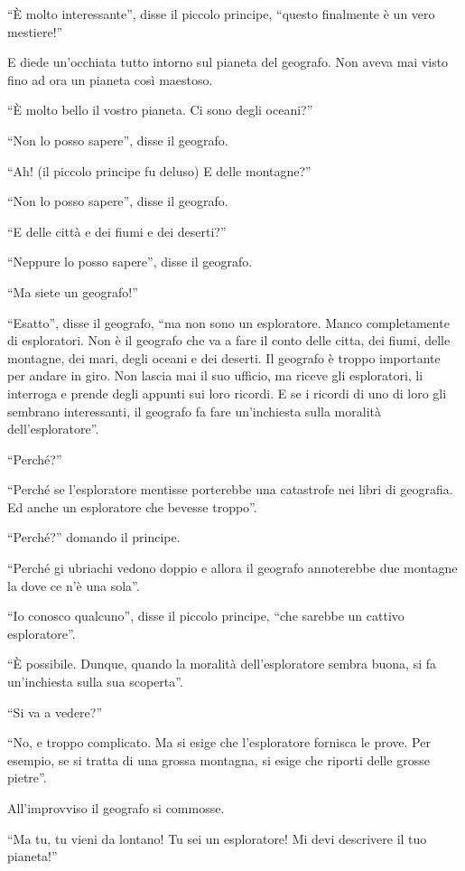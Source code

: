 \documentclass[11pt]{scrbook}
\begin{document}
``È molto interessante'', disse il piccolo principe, ``questo finalmente è un vero mestiere!''

E diede un'occhiata tutto intorno sul pianeta del geografo. Non aveva mai visto fino ad ora un pianeta così maestoso.

``È molto bello il vostro pianeta. Ci sono degli oceani?''

``Non lo posso sapere'', disse il geografo.

``Ah! (il piccolo principe fu deluso) E delle montagne?''

``Non lo posso sapere'', disse il geografo.

``E delle città e dei fiumi e dei deserti?''

``Neppure lo posso sapere'', disse il geografo.

``Ma siete un geografo!''

``Esatto'', disse il geografo, ``ma non sono un esploratore. Manco completamente di esploratori. Non è il geografo che va a fare il conto delle citta, dei fiumi, delle montagne, dei mari, degli oceani e dei deserti. Il geografo è troppo importante per andare in giro. Non lascia mai il suo ufficio, ma riceve gli esploratori, li interroga e prende degli appunti sui loro ricordi. E se i ricordi di uno di loro gli sembrano interessanti, il geografo fa fare un'inchiesta sulla moralità dell'esploratore''.

``Perché?''

``Perché se l'esploratore mentisse porterebbe una catastrofe nei libri di geografia. Ed anche un esploratore che bevesse troppo''.

``Perché?'' domando il principe.

``Perché gi ubriachi vedono doppio e allora il geografo annoterebbe due montagne la dove ce n'è una sola''.

``Io conosco qualcuno'', disse il piccolo principe, ``che sarebbe un cattivo esploratore''.

``È possibile. Dunque, quando la moralità dell'esploratore sembra buona, si fa un'inchiesta sulla sua scoperta''.

``Si va a vedere?''

``No, e troppo complicato. Ma si esige che l'esploratore fornisca le prove. Per esempio, se si tratta di una grossa montagna, si esige che riporti delle grosse pietre''.

All'improvviso il geografo si commosse.

``Ma tu, tu vieni da lontano! Tu sei un esploratore! Mi devi descrivere il tuo pianeta!''
\end{document}
